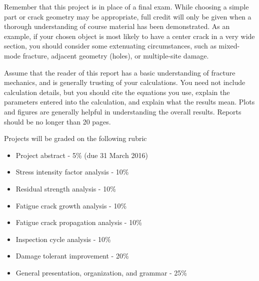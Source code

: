 \documentclass[12pt, oneside]{article}
\begin{document}
Remember that this project is in place of a final exam.
While choosing a simple part or crack geometry may be appropriate, full credit will only be given when a thorough understanding of course material has been demonstrated.
As an example, if your chosen object is most likely to have a center crack in a very wide section, you should consider some extenuating circumstances, such as mixed-mode fracture, adjacent geometry (holes), or multiple-site damage.

Assume that the reader of this report has a basic understanding of fracture mechanics, and is generally trusting of your calculations.
You need not include calculation details, but you should cite the equations you use, explain the parameters entered into the calculation, and explain what the results mean.
Plots and figures are generally helpful in understanding the overall results.
Reports should be no longer than 20 pages.

\newpage
Projects will be graded on the following rubric
\begin{itemize}
	\item Project abstract - 5\% (due 31 March 2016)
	\item Stress intensity factor analysis - 10\%
	\item Residual strength analysis - 10\%
	\item Fatigue crack growth analysis - 10\%
	\item Fatigue crack propagation analysis - 10\%
	\item Inspection cycle analysis - 10\%
	\item Damage tolerant improvement - 20\%
	\item General presentation, organization, and grammar - 25\%
\end{itemize}
\end{document}
